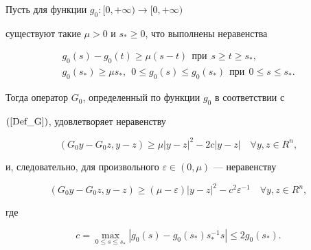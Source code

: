 \begin{lem} \label {b21_L4}


Пусть для функции $g_0 : [0, +\infty) \to [0, +\infty)$


существуют такие $\mu > 0$ и $s_* \geq 0$, что выполнены неравенства


\begin{gather}


g_0(s) -g_0(t) \geq \mu (s -t)\ \ \text{при} \ \ s \geq t \geq s_*,


\label{b21_L4_01}\\


%


g_0(s_*) \geq \mu s_*, \ \


0 \leq g_0(s) \leq g_0(s_*)\ \ \text{при} \ \ 0 \leq s \leq s_*.


\label{b21_L4_02}


\end{gather}


Тогда оператор $G_0$, определенный по функции $g_0$ в соответствии с


$(\ref{Def_G})$, удовлетворяет неравенству


\begin{equation}


(G_0 y -G_0 z, y -z) \geq \mu|y -z|^2 -2c|y -z|


\quad \forall y, z \in R^{ n},


\label{b21_L4_03a}


\end{equation}


и, следовательно, для произвольного $\varepsilon \in (0, \mu)$ --- неравенству


\begin{equation}


(G_0 y -G_0 z, y- z) \geq (\mu -\varepsilon)|y -z|^2 -c^2


\varepsilon ^{-1} \quad \forall y, z \in R^{ n},


\label{b21_L4_03b}


\end{equation}


где


\begin{equation}\label{Def_c_l3}


c=\max_{0 \leq s \leq s_* } {|g_0(s)- g_0(s_*)s_*^{-1} s|}


\leq 2 g_0(s_*).


\end{equation}


\end{lem}





